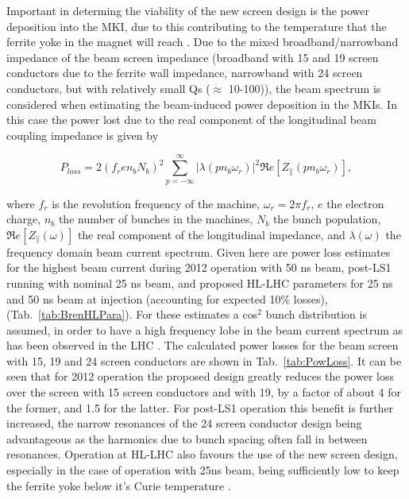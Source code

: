 \documentclass{JAC2003}
\begin{document}
Important in determing the viability of the new screen design is the power deposition into the MKI, due to this contributing to the temperature that the ferrite yoke in the magnet will reach \cite{mki-heatingTemp}. Due to the mixed broadband/narrowband impedance of the beam screen impedance (broadband with 15 and 19 screen conductors due to the ferrite wall impedance, narrowband with 24 screen conductors, but with relatively small Qs ($\approx$ 10-100)), the beam spectrum is considered when estimating the beam-induced power deposition in the MKIs. In this case the power lost due to the real component of the longitudinal beam coupling impedance is given by~\cite{metral_cham2012} 

\begin{equation}
P_{loss} = 2 \left( f_{r} e n_{b}  N_{b}\right)^{2} \displaystyle\sum\limits_{p = -\infty}^{\infty}  \left| \lambda \left( p n_{b} \omega_{r} \right)  \right|^{2} \Re{}e \left[ Z_{\parallel} \left( p n_{b}\omega_{r} \right) \right],
\label{eqn:heating-gen}
\end{equation} 

where $f_{r}$ is the revolution frequency of the machine, $\omega_{r}=2\pi f_{r}$, $e$ the electron charge, $n_{b}$ the number of bunches in the machines, $N_{b}$ the bunch population, $\Re{}e[Z_{\parallel}(\omega )]$ the real component of the longitudinal impedance, and $\lambda (\omega )$ the frequency domain beam current spectrum. Given here are power loss estimates for the highest beam current during 2012 operation with 50 ns beam, post-LS1 running with nominal 25 ns beam, and proposed HL-LHC parameters for 25 ns and 50 ns beam at injection (accounting for expected 10\% losses), (Tab.~\ref{tab:BrenHLPara}). For these estimates a cos$^{2}$ bunch distribution is assumed, in order to have a high frequency lobe in the beam current spectrum as has been observed in the LHC \cite{LHCRF}. The calculated power losses for the beam screen with 15, 19 and 24 screen conductors are shown in Tab.~\ref{tab:PowLoss}. It can be seen that for 2012 operation the proposed design greatly reduces the power loss over the screen with 15 screen conductors and with 19, by a factor of about 4 for the former, and 1.5 for the latter. For post-LS1 operation this benefit is further increased, the narrow resonances of the 24 screen conductor design being advantageous as the harmonics due to bunch spacing often fall in between resonances. Operation at HL-LHC also favours the use of the new screen design, especially in the case of operation with 25ns beam, being sufficiently low to keep the ferrite yoke below it's Curie temperature \cite{mki-heatingTemp}.
\end{document}
